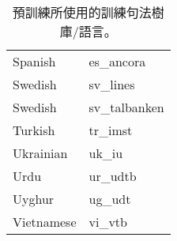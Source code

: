 \begin{table}[h!]
\begin{subtable}[t]{.5\textwidth}
\begin{tabular}[t]{|l l|}
        Spanish & es\_ancora \\
        Swedish & sv\_lines \\
        Swedish & sv\_talbanken \\
        Turkish & tr\_imst \\
        Ukrainian & uk\_iu \\
        Urdu & ur\_udtb \\
        Uyghur & ug\_udt \\
        Vietnamese & vi\_vtb \\
        \hline
    \end{tabular}
\end{subtable}
\caption{預訓練所使用的訓練句法樹庫/語言。}
\label{tab:training_languages}
\end{table}